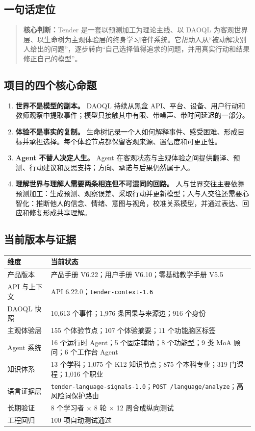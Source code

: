 \documentclass[UTF8,a4paper,11pt]{ctexart}
\newcommand{\keypoint}[1]{\begin{quote}\noindent\textbf{\color{TenderBlue}核心判断：}#1\end{quote}}
\begin{document}
\subsection{一句话定位}

\keypoint{Tender 是一套以预测加工为理论主线、以 DAOQL 为客观世界层、以生命树为主观体验层的终身学习陪伴系统。它帮助人从“被动解决别人给出的问题”，逐步转向“自己选择值得追求的问题，并用真实行动和结果修正自己的模型”。}

\subsection{项目的四个核心命题}

\begin{enumerate}
\item \textbf{世界不是模型的副本。} DAOQL 持续从黑盒 API、平台、设备、用户行动和教师观察中提取事件；模型只接触其中有限、带噪声、带时间延迟的一部分。
\item \textbf{体验不是事实的复制。} 生命树记录一个人如何解释事件、感受困难、形成目标并承担选择。每个体验节点都保留客观来源、置信度和可更正性。
\item \textbf{Agent 不替人决定人生。} Agent 在客观状态与主观体验之间提供翻译、预测、行动建议和反思支持；方向、承诺与后果仍然属于人。
\item \textbf{理解世界与理解人需要两条相连但不可混同的回路。} 人与世界交往主要依靠预测加工：生成预测、观察误差、采取行动并更新模型；人与人交往还需要心智化：推断他人的信念、情绪、意图与视角，校准关系模型，并通过表达、回应和修复形成共享理解。
\end{enumerate}

\subsection{当前版本与证据}

\begin{center}
\begin{tabularx}{\textwidth}{@{}p{4.6cm}X@{}}
\toprule
\textbf{维度} & \textbf{当前状态} \\
\midrule
产品版本 & 产品手册 V6.22；用户手册 V6.10；零基础教学手册 V5.5 \\
API 与上下文 & API 6.22.0；\texttt{tender-context-1.6} \\
DAOQL 快照 & 10,613 个事件；1,976 条因果与来源边；916 个身份 \\
主观体验层 & 155 个体验节点；107 个体验摘要；11 个功能脑区标签 \\
Agent 系统 & 16 个运行时 Agent；5 个固定辅助；8 个功能型；9 类 MoA 顾问；6 个工作台 Agent \\
知识体系 & 13 个学科；1,075 个 K12 知识节点；875 个本科专业；319 门课程；1,016 个职业 \\
语言证据层 & \texttt{tender-language-signals-1.0}；\texttt{POST /language/analyze}；高风险词保护路由 \\
长期验证 & 8 个学习者 × 8 轮 × 12 周合成纵向测试 \\
工程回归 & 100 项自动测试通过 \\
\bottomrule
\end{tabularx}
\end{center}
\end{document}
